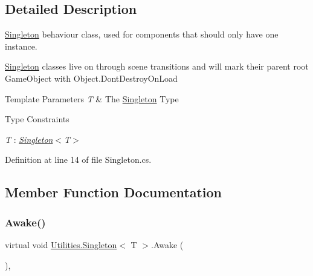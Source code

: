 \subsection{Detailed Description}
\mbox{\hyperlink{class_utilities_1_1_singleton}{Singleton}} behaviour class, used for components that should only have one instance. 

\mbox{\hyperlink{class_utilities_1_1_singleton}{Singleton}} classes live on through scene transitions and will mark their parent root Game\+Object with Object.\+Dont\+Destroy\+On\+Load


\begin{DoxyTemplParams}{Template Parameters}
{\em T} & The \mbox{\hyperlink{class_utilities_1_1_singleton}{Singleton}} Type\\
\hline
\end{DoxyTemplParams}
\begin{Desc}
\item[Type Constraints]\begin{description}
\item[{\em T} : {\em \mbox{\hyperlink{class_utilities_1_1_singleton}{Singleton}}$<$T$>$}]\end{description}
\end{Desc}


Definition at line 14 of file Singleton.\+cs.



\subsection{Member Function Documentation}
\mbox{\label{class_utilities_1_1_singleton_a634b915d7ac492899512de602d59e650}} 
\subsubsection{\texorpdfstring{Awake()}{Awake()}}
{\footnotesize\ttfamily virtual void \mbox{\hyperlink{class_utilities_1_1_singleton}{Utilities.\+Singleton}}$<$ T $>$.Awake (\begin{DoxyParamCaption}{ }\end{DoxyParamCaption})\hspace{0.3cm}{\ttfamily [protected]}, {\ttfamily [virtual]}}



